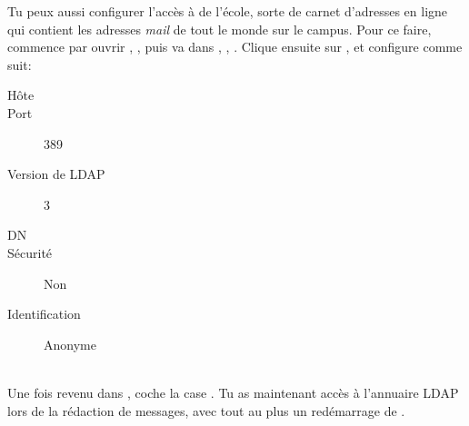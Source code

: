 Tu peux aussi configurer l'accès à  de l'école, sorte de carnet d'adresses en ligne qui contient les adresses \emph{mail} de tout le monde sur le campus. Pour ce faire, commence par ouvrir , , puis va dans , , . Clique ensuite sur , et configure comme suit: \\
\smallskip
\begin{minipage}[t]{0.48\textwidth}
\begin{description}
  \item[Hôte] 
  \item[Port] 389
  \item[Version de LDAP] 3
\end{description}  
\end{minipage} 
\begin{minipage}[t]{0.48\textwidth}
\begin{description}  
  \item[DN] 
  \item[Sécurité] Non
  \item[Identification] Anonyme
\end{description}
\end{minipage} \\
Une fois revenu dans , coche la case . Tu as maintenant accès à l'annuaire LDAP lors de la
rédaction de messages, avec tout au plus un redémarrage de . 
%
%
\noindent
